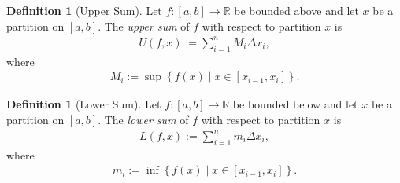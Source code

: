 \documentclass{amsart}
\numberwithin{equation}{section}
\theoremstyle{plain}
\theoremstyle{definition}
\newtheorem{definition}[theorem]{Definition}
\theoremstyle{remark}
\begin{document}
\begin{definition}[Upper Sum]
  Let $f:[a,b] \to \mathbb{R}$ be bounded above and let $x$ be a partition on $[a,b]$.
  The \emph{upper sum} of $f$ with respect to partition $x$ is
  \begin{align*}
    U(f, x) := \sum_{i=1}^n M_i \Delta x_i,
  \end{align*}
  where
  \begin{align*}
    M_i := \sup\left\{ f(x) \mid x \in [x_{i-1}, x_i]\right\}.
  \end{align*}
\end{definition}

\begin{definition}[Lower Sum]
  Let $f:[a,b] \to \mathbb{R}$ be bounded below and let $x$ be a partition on $[a,b]$.
  The \emph{lower sum} of $f$ with respect to partition $x$ is
  \begin{align*}
    L(f, x) := \sum_{i=1}^n m_i \Delta x_i,
  \end{align*}
  where
  \begin{align*}
    m_i := \inf\left\{ f(x) \mid x \in [x_{i-1}, x_i]\right\}.
  \end{align*}
\end{definition}
\end{document}
